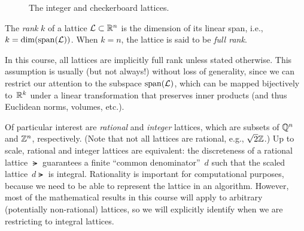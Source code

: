 \documentclass[11pt]{article}
\begin{document}
\begin{figure}[h!]
  \centering

  \quad

  \caption{The integer and checkerboard lattices.}
  \label{fig:lattices}
\end{figure}

\begin{definition}
  \label{def:rank}
  The \emph{rank} $k$ of a lattice $\mathcal{L} \subset \mathbb{R}^{n}$ is the
  dimension of its linear span, i.e., $k=\dim(\operatorname{span}(\mathcal{L}))$.  When
  $k=n$, the lattice is said to be \emph{full rank}.
\end{definition}

In this course, all lattices are implicitly full rank unless stated
otherwise. This assumption is usually (but not always!) without loss
of generality, since we can restrict our attention to the subspace
$\operatorname{span}(\mathcal{L})$, which can be mapped bijectively to~$\mathbb{R}^{k}$ under a
linear transformation that preserves inner products (and thus
Euclidean norms, volumes, etc.).

Of particular interest are \emph{rational} and \emph{integer}
lattices, which are subsets of $\mathbb{Q}^n$ and $\mathbb{Z}^n$, respectively.  (Note
that not all lattices are rational, e.g., $\sqrt{2} \mathbb{Z}$.)  Up to
scale, rational and integer lattices are equivalent: the discreteness
of a rational lattice $\lat$ guarantees a finite ``common
denominator''~$d$ such that the scaled lattice~$d \lat$ is integral.
Rationality is important for computational purposes, because we need
to be able to represent the lattice in an algorithm. However, most of
the mathematical results in this course will apply to arbitrary
(potentially non-rational) lattices, so we will explicitly identify
when we are restricting to integral lattices.
\end{document}
